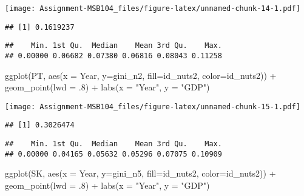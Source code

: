 \documentclass[
]{article}
\newenvironment{Shaded}{\begin{snugshade}}{\end{snugshade}}
\newcommand{\AttributeTok}[1]{\textcolor[rgb]{0.77,0.63,0.00}{#1}}
\newcommand{\DecValTok}[1]{\textcolor[rgb]{0.00,0.00,0.81}{#1}}
\newcommand{\FunctionTok}[1]{\textcolor[rgb]{0.00,0.00,0.00}{#1}}
\newcommand{\NormalTok}[1]{#1}
\newcommand{\SpecialCharTok}[1]{\textcolor[rgb]{0.00,0.00,0.00}{#1}}
\newcommand{\StringTok}[1]{\textcolor[rgb]{0.31,0.60,0.02}{#1}}
\begin{document}
\texttt{[image: Assignment-MSB104\_files/figure-latex/unnamed-chunk-14-1.pdf]}

\begin{verbatim}
## [1] 0.1619237
\end{verbatim}

\begin{verbatim}
##    Min. 1st Qu.  Median    Mean 3rd Qu.    Max. 
## 0.00000 0.06682 0.07380 0.06816 0.08043 0.11258
\end{verbatim}

\begin{Shaded}
\begin{Highlighting}[]
  \FunctionTok{ggplot}\NormalTok{(PT, }\FunctionTok{aes}\NormalTok{(}\AttributeTok{x =}\NormalTok{ Year, }\AttributeTok{y=}\NormalTok{gini\_n2, }\AttributeTok{fill=}\NormalTok{id\_nuts2, }\AttributeTok{color=}\NormalTok{id\_nuts2)) }\SpecialCharTok{+}
  \FunctionTok{geom\_point}\NormalTok{(}\AttributeTok{lwd =}\NormalTok{ .}\DecValTok{8}\NormalTok{) }\SpecialCharTok{+}
   \FunctionTok{labs}\NormalTok{(}\AttributeTok{x =} \StringTok{"Year"}\NormalTok{, }\AttributeTok{y =} \StringTok{"GDP"}\NormalTok{)}
\end{Highlighting}
\end{Shaded}

\texttt{[image: Assignment-MSB104\_files/figure-latex/unnamed-chunk-15-1.pdf]}

\begin{verbatim}
## [1] 0.3026474
\end{verbatim}

\begin{verbatim}
##    Min. 1st Qu.  Median    Mean 3rd Qu.    Max. 
## 0.00000 0.04165 0.05632 0.05296 0.07075 0.10909
\end{verbatim}

\begin{Shaded}
\begin{Highlighting}[]
  \FunctionTok{ggplot}\NormalTok{(SK, }\FunctionTok{aes}\NormalTok{(}\AttributeTok{x =}\NormalTok{ Year, }\AttributeTok{y=}\NormalTok{gini\_n5, }\AttributeTok{fill=}\NormalTok{id\_nuts2, }\AttributeTok{color=}\NormalTok{id\_nuts2)) }\SpecialCharTok{+}
  \FunctionTok{geom\_point}\NormalTok{(}\AttributeTok{lwd =}\NormalTok{ .}\DecValTok{8}\NormalTok{) }\SpecialCharTok{+}
   \FunctionTok{labs}\NormalTok{(}\AttributeTok{x =} \StringTok{"Year"}\NormalTok{, }\AttributeTok{y =} \StringTok{"GDP"}\NormalTok{)}
\end{Highlighting}
\end{Shaded}
\end{document}
